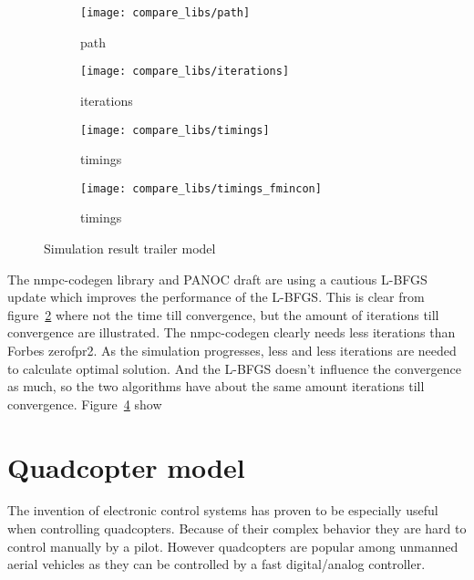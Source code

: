 \begin{figure}[H]
	\centering
	\begin{subfigure}[b]{0.45\textwidth}
		\centering
		\texttt{[image: compare\_libs/path]}
		\caption{path}
		\label{fig:solution path trailer example}
	\end{subfigure}
	\hfill
	\begin{subfigure}[b]{0.45\textwidth}
		\centering
		\texttt{[image: compare\_libs/iterations]}
		\caption{iterations}
		\label{fig:iterations trailer example}
	\end{subfigure}
	
	\begin{subfigure}[b]{0.45\textwidth}
		\centering
		\texttt{[image: compare\_libs/timings]}
		\caption{timings}
		\label{fig:timings trailer example}
	\end{subfigure}
	\hfill
	\begin{subfigure}[b]{0.45\textwidth}
		\centering
		\texttt{[image: compare\_libs/timings\_fmincon]}
		\caption{timings}
		\label{fig:timings fmincon Matlab trailer example}
	\end{subfigure}
	\caption{Simulation result trailer model}
	\label{fig:simulation result trailer model}
\end{figure}

The nmpc-codegen library and PANOC draft are using a cautious L-BFGS update which improves the performance of the L-BFGS. This is clear from figure~\ref{fig:iterations trailer example} where not the time till convergence, but the amount of iterations till convergence are illustrated. The nmpc-codegen clearly needs less iterations than  Forbes zerofpr2. As the simulation progresses, less and less iterations are needed to calculate optimal solution. And the L-BFGS doesn't influence the convergence as much, so the two algorithms have about the same amount iterations till convergence. Figure~\ref{fig:timings fmincon Matlab trailer example} show


\section{Quadcopter model}
The invention of electronic control systems has proven to be especially useful when controlling quadcopters. Because of their complex behavior they are hard to control manually by a pilot. However quadcopters are popular among unmanned aerial vehicles as they can be controlled by a fast digital/analog controller.

